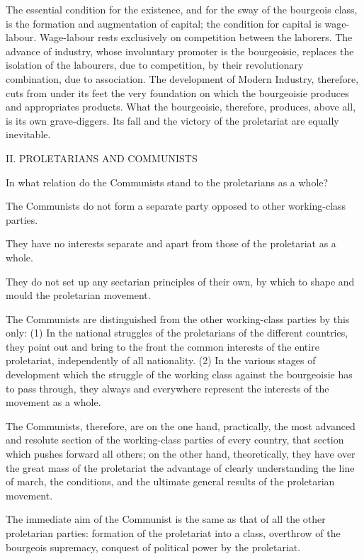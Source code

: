 The essential condition for the existence, and for the sway of the
bourgeois class, is the formation and augmentation of capital; the
condition for capital is wage-labour. Wage-labour rests exclusively on
competition between the laborers. The advance of industry, whose
involuntary promoter is the bourgeoisie, replaces the isolation of the
labourers, due to competition, by their revolutionary combination, due
to association. The development of Modern Industry, therefore, cuts
from under its feet the very foundation on which the bourgeoisie
produces and appropriates products. What the bourgeoisie, therefore,
produces, above all, is its own grave-diggers. Its fall and the victory
of the proletariat are equally inevitable.




II.
PROLETARIANS AND COMMUNISTS


In what relation do the Communists stand to the proletarians as a
whole?

The Communists do not form a separate party opposed to other
working-class parties.

They have no interests separate and apart from those of the proletariat
as a whole.

They do not set up any sectarian principles of their own, by which to
shape and mould the proletarian movement.

The Communists are distinguished from the other working-class parties
by this only: (1) In the national struggles of the proletarians of the
different countries, they point out and bring to the front the common
interests of the entire proletariat, independently of all nationality.
(2) In the various stages of development which the struggle of the
working class against the bourgeoisie has to pass through, they always
and everywhere represent the interests of the movement as a whole.

The Communists, therefore, are on the one hand, practically, the most
advanced and resolute section of the working-class parties of every
country, that section which pushes forward all others; on the other
hand, theoretically, they have over the great mass of the proletariat
the advantage of clearly understanding the line of march, the
conditions, and the ultimate general results of the proletarian
movement.

The immediate aim of the Communist is the same as that of all the other
proletarian parties: formation of the proletariat into a class,
overthrow of the bourgeois supremacy, conquest of political power by
the proletariat.

